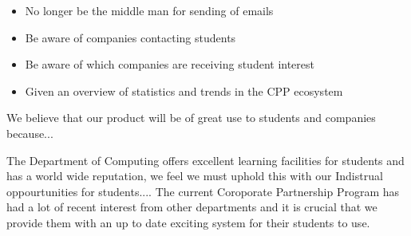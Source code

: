 \begin{itemize}
  \item No longer be the middle man for sending of emails
  \item Be aware of companies contacting students
  \item Be aware of which companies are receiving student interest
  \item Given an overview of statistics and trends in the CPP ecosystem
\end{itemize}

We believe that our product will be of great use to students and companies because...

The Department of Computing offers excellent learning facilities for students and has a world wide reputation, we feel we must uphold this with our Indistrual oppourtunities for students....
The current Coroporate Partnership Program has had a lot of recent interest from other departments and it is crucial that we provide them with an up to date exciting system for their students to use.
